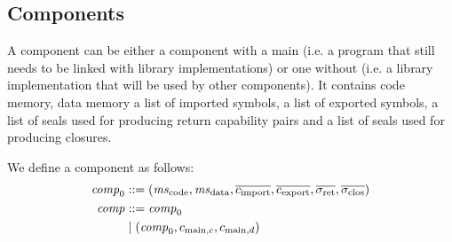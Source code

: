 \documentclass[a4paper]{article}
\begin{document}
\subsection{Components}
\label{sec:components}

A component can be either a component with a main (i.e. a program that still needs to be linked with library implementations) or one without (i.e. a library implementation that will be used by other components). 
It contains code memory, data memory a list of imported symbols, a list of exported symbols, a list of seals used for producing return capability pairs and a list of seals used for producing closures.

We define a component as follows:
\begin{align*}
  \var{comp}_0 &\mathrel{::=} (\mscode,\msdata,\overline{c_{\mathrm{import}}},\overline{c_{\mathrm{export}}},\sigrets,\sigcloss)\\
  \var{comp} &\mathrel{::=} \var{comp}_0\\
               &\mid  (\var{comp}_0,c_{\mathrm{main},c}, c_{\mathrm{main},d})
\end{align*}
\end{document}
